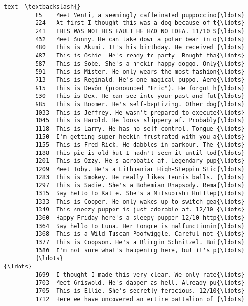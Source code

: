 \documentclass[11pt]{article}
\begin{document}
\begin{Verbatim}[commandchars=\\\{\}]
                                                            text  \textbackslash{}
         85    Meet Venti, a seemingly caffeinated puppoccino{\ldots}   
         224   At first I thought this was a dog because of t{\ldots}   
         241   THIS WAS NOT HIS FAULT HE HAD NO IDEA. 11/10 S{\ldots}   
         432   Meet Sunny. He can take down a polar bear in o{\ldots}   
         480   This is Akumi. It's his birthday. He received {\ldots}   
         487   This is Oshie. He's ready to party. Bought tha{\ldots}   
         587   This is Sobe. She's a h*ckin happy doggo. Only{\ldots}   
         591   This is Mister. He only wears the most fashion{\ldots}   
         713   This is Reginald. He's one magical puppo. Aero{\ldots}   
         915   This is Devón (pronounced "Eric"). He forgot h{\ldots}   
         930   This is Dex. He can see into your past and fut{\ldots}   
         985   This is Boomer. He's self-baptizing. Other dog{\ldots}   
         1033  This is Jeffrey. He wasn't prepared to execute{\ldots}   
         1045  This is Harold. He looks slippery af. Probably{\ldots}   
         1118  This is Larry. He has no self control. Tongue {\ldots}   
         1150  I'm getting super heckin frustrated with you a{\ldots}   
         1155  This is Fred-Rick. He dabbles in parkour. The {\ldots}   
         1188  This pic is old but I hadn't seen it until tod{\ldots}   
         1201  This is Ozzy. He's acrobatic af. Legendary pup{\ldots}   
         1209  Meet Toby. He's a Lithuanian High-Steppin Stic{\ldots}   
         1283  This is Smokey. He really likes tennis balls. {\ldots}   
         1297  This is Sadie. She's a Bohemian Rhapsody. Rema{\ldots}   
         1315  Say hello to Katie. She's a Mitsubishi Hufflep{\ldots}   
         1333  This is Cooper. He only wakes up to switch gea{\ldots}   
         1349  This sneezy pupper is just adorable af. 12/10 {\ldots}   
         1360  Happy Friday here's a sleepy pupper 12/10 http{\ldots}   
         1364  Say hello to Luna. Her tongue is malfunctionin{\ldots}   
         1368  This is a Wild Tuscan Poofwiggle. Careful not {\ldots}   
         1377  This is Coopson. He's a Blingin Schnitzel. Bui{\ldots}   
         1380  I'm not sure what's happening here, but it's p{\ldots}   
         {\ldots}                                                 {\ldots}   
         1699  I thought I made this very clear. We only rate{\ldots}   
         1703  Meet Griswold. He's dapper as hell. Already pu{\ldots}   
         1705  This is Ellie. She's secretly ferocious. 12/10{\ldots}   
         1712  Here we have uncovered an entire battalion of {\ldots}   

\end{Verbatim}
\end{document}
